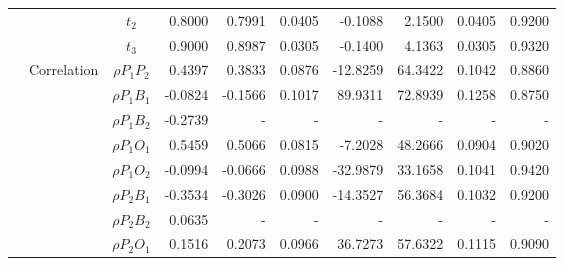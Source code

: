 \documentclass[letterpaper]{article}
\begin{document}
\begin{table}[h]
\begin{tabular}{cccrrrrrrr}
            &             & $t_2$          & 0.8000                 & 0.7991                 & 0.0405                 & -0.1088                & 2.1500                 & 0.0405                   & 0.9200                 \\
            &             & $t_3$          & 0.9000                 & 0.8987                 & 0.0305                 & -0.1400                & 4.1363                 & 0.0305                   & 0.9320                 \\
            & Correlation & $\rho{P_1P_2}$ & 0.4397                 & 0.3833                 & 0.0876                 & -12.8259               & 64.3422                & 0.1042                   & 0.8860                 \\
            &             & $\rho{P_1B_1}$ & -0.0824                & -0.1566                & 0.1017                 & 89.9311                & 72.8939                & 0.1258                   & 0.8750                 \\
            &             & $\rho{P_1B_2}$ & -0.2739                & -                      & -                      & -                      & -                      & -                        & -                      \\
            &             & $\rho{P_1O_1}$ & 0.5459                 & 0.5066                 & 0.0815                 & -7.2028                & 48.2666                & 0.0904                   & 0.9020                 \\
            &             & $\rho{P_1O_2}$ & -0.0994                & -0.0666                & 0.0988                 & -32.9879               & 33.1658                & 0.1041                   & 0.9420                 \\
            &             & $\rho{P_2B_1}$ & -0.3534                & -0.3026                & 0.0900                 & -14.3527               & 56.3684                & 0.1032                   & 0.9200                 \\
            &             & $\rho{P_2B_2}$ & 0.0635                 & -                      & -                      & -                      & -                      & -                        & -                      \\
            &             & $\rho{P_2O_1}$ & 0.1516                 & 0.2073                 & 0.0966                 & 36.7273                & 57.6322                & 0.1115                   & 0.9090                 \\

\end{tabular}
\end{table}
\end{document}
